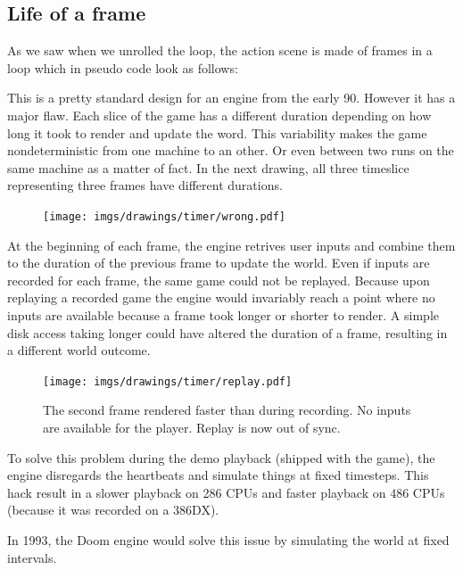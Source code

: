 \subsection{Life of a frame}
As we saw when we unrolled the loop, the action scene is made of frames in a loop which in pseudo code look as follows:\\
\par
\begin{minipage}{\textwidth}
 
 \end{minipage}
\par
This is a pretty standard design for an engine from the early 90. However it has a major flaw. Each slice of the game has a different duration depending on how long it took to render and update the word. This variability makes the game nondeterministic from one machine to an other. Or even between two runs on the same machine as a matter of fact. In the next drawing, all three timeslice representing three frames have different durations.\\
\begin{figure}[H]
\centering
 \texttt{[image: imgs/drawings/timer/wrong.pdf]}
 
 \end{figure}
  At the beginning of each frame, the engine retrives user inputs and combine them to the duration of the previous frame to update the world. Even if inputs are recorded for each frame, the same game could not be replayed. Because upon replaying a recorded game the engine would invariably reach a point where no inputs are available because a frame took longer or shorter to render. A simple disk access taking longer could have altered the duration of a frame, resulting in a different world outcome.\\
 \begin{figure}[H]
\centering
 \texttt{[image: imgs/drawings/timer/replay.pdf]}
 \caption{The second frame rendered faster than during recording. No inputs are available for the player. Replay is now out of sync.}
 \end{figure}
\par
To solve this problem during the demo playback (shipped with the game), the engine disregards the heartbeats and simulate things at fixed timesteps. This hack result in a slower playback on 286 CPUs and faster playback on 486 CPUs (because it was recorded on a 386DX).\\
\par
In 1993, the Doom engine would solve this issue by simulating the world at fixed intervals.\\
